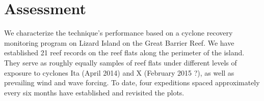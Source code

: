\section{Assessment}

We characterize the technique's performance based on a cyclone recovery monitoring program on Lizard Island on the Great Barrier Reef. We have established 21 reef records on the reef flats along the perimeter of the island. They serve as roughly equally samples of reef flats under different levels of exposure to cyclones Ita (April 2014) and X (February 2015 ?), as well as prevailing wind and wave forcing. To date, four expeditions spaced approximately every six months have established and revisited the plots.
